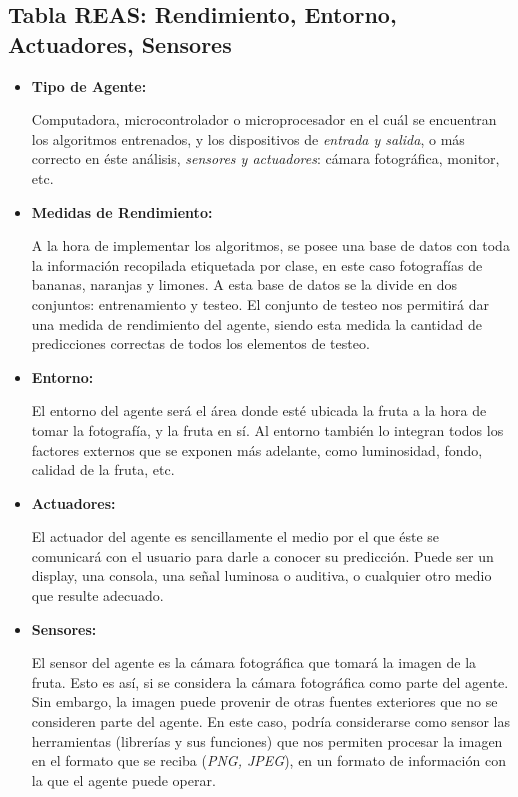 \documentclass[10pt,a4paper]{article}
\begin{document}
\subsection{Tabla REAS: Rendimiento, Entorno, Actuadores, Sensores}
\begin{itemize}
\item \textbf{Tipo de Agente:}

Computadora, microcontrolador o microprocesador en el cuál se encuentran los algoritmos entrenados, y los dispositivos de \textit{entrada y salida}, o más correcto en éste análisis, \textit{sensores y actuadores}: cámara fotográfica, monitor, etc.

\item \textbf{Medidas de Rendimiento:}

A la hora de implementar los algoritmos, se posee una base de datos con toda la información recopilada etiquetada por clase, en este caso fotografías de bananas, naranjas y limones. A esta base de datos se la divide en dos conjuntos: entrenamiento y testeo. El conjunto de testeo nos permitirá dar una medida de rendimiento del agente, siendo esta medida la cantidad de predicciones correctas de todos los elementos de testeo.

\item \textbf{Entorno:}

El entorno del agente será el área donde esté ubicada la fruta a la hora de tomar la fotografía, y la fruta en sí. Al entorno también lo integran todos los factores externos que se exponen más adelante, como luminosidad, fondo, calidad de la fruta, etc.

\item \textbf{Actuadores:}

El actuador del agente es sencillamente el medio por el que éste se comunicará con el usuario para darle a conocer su predicción. Puede ser un display, una consola, una señal luminosa o auditiva, o cualquier otro medio que resulte adecuado.

\item \textbf{Sensores:}

El sensor del agente es la cámara fotográfica que tomará la imagen de la fruta. Esto es así, si se considera la cámara fotográfica como parte del agente. Sin embargo, la imagen puede provenir de otras fuentes exteriores que no se consideren parte del agente. En este caso, podría considerarse como sensor las herramientas (librerías y sus funciones) que nos permiten procesar la imagen en el formato que se reciba (\textit{PNG, JPEG}), en un formato de información con la que el agente puede operar.

\end{itemize}
 
\end{document}
